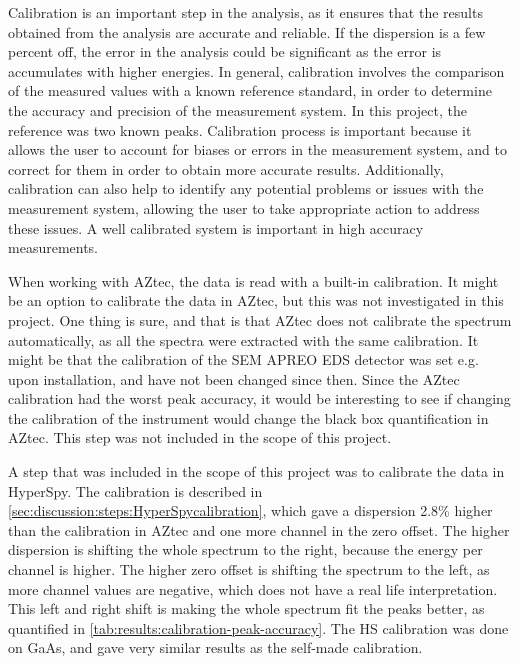 Calibration is an important step in the analysis, as it ensures that the results obtained from the analysis are accurate and reliable.
If the dispersion is a few percent off, the error in the analysis could be significant as the error is accumulates with higher energies.
In general, calibration involves the comparison of the measured values with a known reference standard, in order to determine the accuracy and precision of the measurement system.
In this project, the reference was two known peaks.
Calibration process is important because it allows the user to account for biases or errors in the measurement system, and to correct for them in order to obtain more accurate results.
Additionally, calibration can also help to identify any potential problems or issues with the measurement system, allowing the user to take appropriate action to address these issues.
A well calibrated system is important in high accuracy measurements.

When working with AZtec, the data is read with a built-in calibration.
It might be an option to calibrate the data in AZtec, but this was not investigated in this project.
One thing is sure, and that is that AZtec does not calibrate the spectrum automatically, as all the spectra were extracted with the same calibration.
It might be that the calibration of the SEM APREO EDS detector was set e.g. upon installation, and have not been changed since then.
Since the AZtec calibration had the worst peak accuracy, it would be interesting to see if changing the calibration of the instrument would change the black box quantification in AZtec.
This step was not included in the scope of this project.


A step that was included in the scope of this project was to calibrate the data in HyperSpy.
The calibration is described in \cref{sec:discussion:steps:HyperSpycalibration}, which gave a dispersion 2.8\% higher than the calibration in AZtec and one more channel in the zero offset.
The higher dispersion is shifting the whole spectrum to the right, because the energy per channel is higher.
The higher zero offset is shifting the spectrum to the left, as more channel values are negative, which does not have a real life interpretation.
This left and right shift is making the whole spectrum fit the peaks better, as quantified in \cref{tab:results:calibration-peak-accuracy}.
The HS calibration was done on GaAs, and gave very similar results as the self-made calibration.


